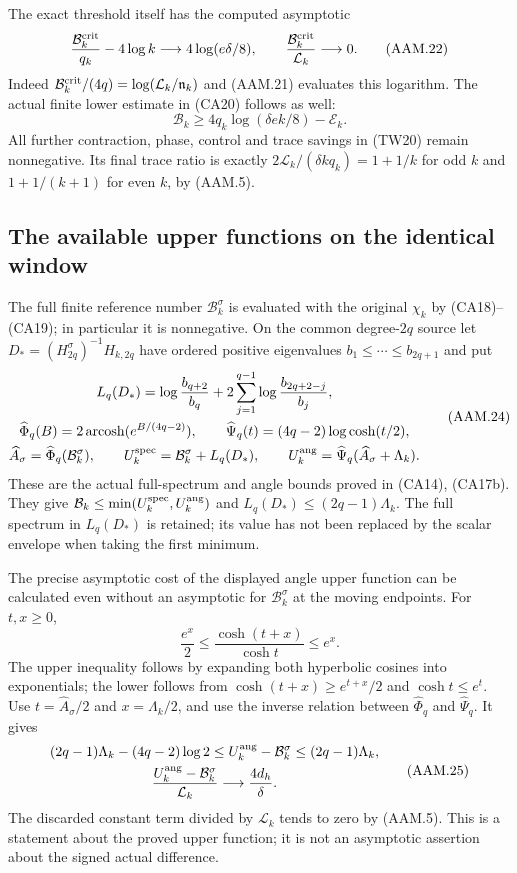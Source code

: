 The exact threshold itself has the computed asymptotic
\[
 \frac{\mathcal B_k^{\rm crit}}{q_k}-4\log k
          \longrightarrow4\log(e\delta/8),\qquad
 \frac{\mathcal B_k^{\rm crit}}{\mathcal L_k}\longrightarrow0.
 \tag{AAM.22}
\]
Indeed $\mathcal B_k^{\rm crit}/(4q)=\log(\mathcal L_k/
\mathfrak n_k)$ and (AAM.21) evaluates this logarithm.
The actual finite lower estimate in (CA20) follows as well:
\[
 \mathcal B_k\geq4q_k\log(\delta e k/8)-\mathcal E_k.
 \tag{AAM.23}
\]
All further contraction, phase, control and trace savings in (TW20)
remain nonnegative. Its final trace ratio is exactly
$2\mathcal L_k/(\delta kq_k)=1+1/k$ for odd $k$ and
$1+1/(k+1)$ for even $k$, by (AAM.5).

\subsection{The available upper functions on the identical window}

The full finite reference number $\mathcal B_k^\sigma$ is evaluated
with the original $\chi_k$ by (CA18)--(CA19); in particular it is
nonnegative. On the common degree-$2q$ source let
$D_*=(H_{2q}^\sigma)^{-1}H_{k,2q}$ have ordered positive
eigenvalues $b_1\leq\cdots\leq b_{2q+1}$ and put
\[
 \begin{gathered}
 L_q(D_*)=\log\frac{b_{q+2}}{b_q}
           +2\sum_{j=1}^{q-1}\log\frac{b_{2q+2-j}}{b_j},\\
 \widehat\Phi_q(B)=2\operatorname{arcosh}(e^{B/(4q-2)}),\qquad
 \widehat\Psi_q(t)=(4q-2)\log\cosh(t/2),\\
 \widehat A_\sigma=\widehat\Phi_q(\mathcal B_k^\sigma),\qquad
 U_k^{\rm spec}=\mathcal B_k^\sigma+L_q(D_*),\qquad
 U_k^{\rm ang}=\widehat\Psi_q(\widehat A_\sigma+\Lambda_k).
 \end{gathered}
 \tag{AAM.24}
\]
These are the actual full-spectrum and angle bounds proved in
(CA14), (CA17b). They give
$\mathcal B_k\leq\min(U_k^{\rm spec},U_k^{\rm ang})$ and
$L_q(D_*)\leq(2q-1)\Lambda_k$. The full spectrum in
$L_q(D_*)$ is retained; its value has not been replaced by the
scalar envelope when taking the first minimum.

The precise asymptotic cost of the displayed angle upper function
can be calculated even without an asymptotic for
$\mathcal B_k^\sigma$ at the moving endpoints. For $t,x\geq0$,
\[
 \frac{e^x}{2}\leq\frac{\cosh(t+x)}{\cosh t}\leq e^x.
\]
The upper inequality follows by expanding both hyperbolic cosines into
exponentials; the lower follows from $\cosh(t+x)\geq e^{t+x}/2$
and $\cosh t\leq e^t$. Use $t=\widehat A_\sigma/2$ and
$x=\Lambda_k/2$, and use the inverse relation between
$\widehat\Phi_q$ and $\widehat\Psi_q$. It gives
\[
 \begin{gathered}
 (2q-1)\Lambda_k-(4q-2)\log2
 \leq U_k^{\rm ang}-\mathcal B_k^\sigma
 \leq(2q-1)\Lambda_k,\\
 \frac{U_k^{\rm ang}-\mathcal B_k^\sigma}{\mathcal L_k}
       \longrightarrow\frac{4d_h}{\delta}.
 \end{gathered}
 \tag{AAM.25}
\]
The discarded constant term divided by $\mathcal L_k$ tends to zero
by (AAM.5). This is a statement about the proved upper function;
it is not an asymptotic assertion about the signed actual difference.

